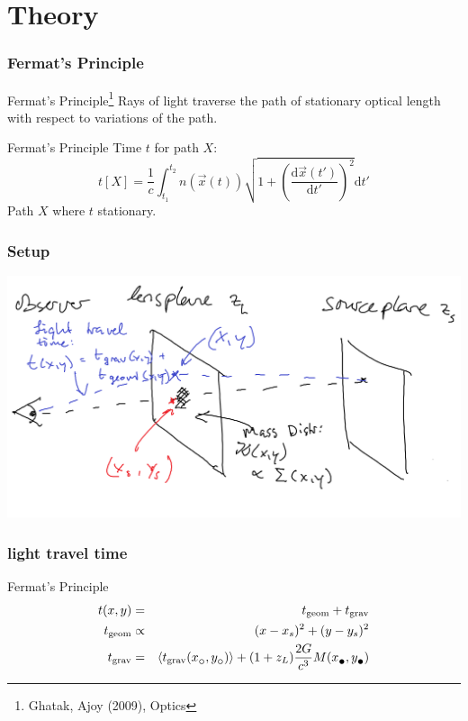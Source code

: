 \documentclass{beamer}
\newcommand{\subcirc}{{\lower.33ex\hbox{$\circ$}}}
\newcommand{\subbullet}{{\lower.33ex\hbox{$\bullet$}}}
\begin{document}
\section{Theory}




\begin{frame}
  \frametitle{Fermat’s Principle}
  \begin{block}{Fermat’s Principle\footnote{Ghatak, Ajoy (2009), Optics}}
    Rays of light traverse the path of stationary optical length\\
    with respect to variations of the path.
    
  \end{block}

  \begin{block}{Fermat’s Principle}
    Time $t$ for path $X$:
    $$t\left[X\right] = \frac{1}{c}\int_{t_1}^{t_2}n\left(\vec{x}\left(t\right)\right)\sqrt{1+\left(\frac{\text{d}\vec{x}\left(t'\right)}{\text{d}t'}\right)^2}\text{d}t'$$
    Path $X$ where $t$ stationary.
  \end{block}
\end{frame}



\begin{frame}
	\frametitle{Setup}
	\includegraphics[width=\textwidth]{imgs/sketch_arrtime}
\end{frame}


\begin{frame}
	\frametitle{light travel time}
	\begin{block}{Fermat’s Principle}
		\begin{eqnarray}
			t(x,y) &=& t_\text{geom} + t_\text{grav} \\
			t_\text{geom} &\propto & (x - x_s)^2 + (y-y_s)^2 \\
			t_\text{grav} &=& \left\langle t_\text{grav}(x_\subcirc,y_\subcirc) \right\rangle + (1+z_L) \frac{2G}{c^3} M(x_\subbullet,y_\subbullet)
		\end{eqnarray}
	\end{block}
\end{frame}
\end{document}
